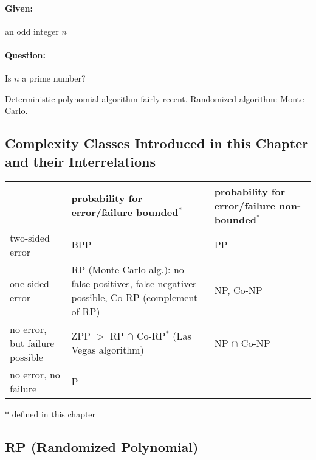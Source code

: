 \documentclass[11pt]{article}
\theoremstyle{definition}
\theoremstyle{definition}
\begin{document}
\paragraph{Given:} an odd integer $ n $
\paragraph{Question:} Is $ n $ a prime number?

Deterministic polynomial algorithm fairly recent. Randomized algorithm: Monte Carlo.

\subsection{Complexity Classes Introduced in this Chapter and their Interrelations}

\bgroup
\def\arraystretch{1.5}
\begin{tabular}{>{\raggedright\let\newline\\\arraybackslash\hspace{0pt}}p{3.5cm}| >{\raggedright\let\newline\\\arraybackslash\hspace{0pt}}p{5cm} | >{\raggedright\let\newline\\\arraybackslash\hspace{0pt}}p{5cm}}
& probability for error/failure bounded$^\ast$ & probability for error/failure non-bounded$^\ast$ \\
\hline
\hline
two-sided error & BPP & PP \\
\hline
one-sided error & RP (Monte Carlo alg.): no false positives, false negatives possible, Co-RP (complement of RP) & NP, Co-NP \\
\hline
no error, but failure possible & ZPP $ > $ RP $ \cap $ Co-RP$^\ast$ (Las Vegas algorithm) & NP $ \cap $ Co-NP \\
\hline
no error, no failure & P & \\
\end{tabular}
\egroup \medskip

$\ast$ defined in this chapter

\subsection{RP (Randomized Polynomial)}
\end{document}
